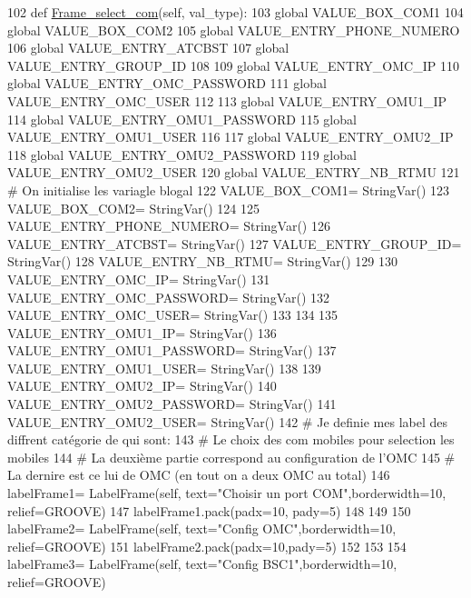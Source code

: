 \begin{DoxyCode}
102 \textcolor{keyword}{def }\hyperlink{namespaceScript_1_1interfaceFrame_a3538cb8357b74776a380240ed3221bc0}{Frame\_select\_com}(self, val\_type):
103     \textcolor{keyword}{global} VALUE\_BOX\_COM1 
104     \textcolor{keyword}{global} VALUE\_BOX\_COM2
105     \textcolor{keyword}{global} VALUE\_ENTRY\_PHONE\_NUMERO
106     \textcolor{keyword}{global} VALUE\_ENTRY\_ATCBST
107     \textcolor{keyword}{global} VALUE\_ENTRY\_GROUP\_ID
108 
109     \textcolor{keyword}{global} VALUE\_ENTRY\_OMC\_IP
110     \textcolor{keyword}{global} VALUE\_ENTRY\_OMC\_PASSWORD
111     \textcolor{keyword}{global} VALUE\_ENTRY\_OMC\_USER
112 
113     \textcolor{keyword}{global} VALUE\_ENTRY\_OMU1\_IP
114     \textcolor{keyword}{global} VALUE\_ENTRY\_OMU1\_PASSWORD
115     \textcolor{keyword}{global} VALUE\_ENTRY\_OMU1\_USER
116 
117     \textcolor{keyword}{global} VALUE\_ENTRY\_OMU2\_IP
118     \textcolor{keyword}{global} VALUE\_ENTRY\_OMU2\_PASSWORD
119     \textcolor{keyword}{global} VALUE\_ENTRY\_OMU2\_USER
120     \textcolor{keyword}{global} VALUE\_ENTRY\_NB\_RTMU
121     \textcolor{comment}{# On initialise les variagle blogal
}
122     VALUE\_BOX\_COM1= StringVar()
123     VALUE\_BOX\_COM2= StringVar()
124 
125     VALUE\_ENTRY\_PHONE\_NUMERO= StringVar()
126     VALUE\_ENTRY\_ATCBST= StringVar()
127     VALUE\_ENTRY\_GROUP\_ID= StringVar()
128     VALUE\_ENTRY\_NB\_RTMU= StringVar()
129 
130     VALUE\_ENTRY\_OMC\_IP= StringVar()
131     VALUE\_ENTRY\_OMC\_PASSWORD= StringVar()
132     VALUE\_ENTRY\_OMC\_USER= StringVar()
133 
134 
135     VALUE\_ENTRY\_OMU1\_IP= StringVar()
136     VALUE\_ENTRY\_OMU1\_PASSWORD= StringVar()
137     VALUE\_ENTRY\_OMU1\_USER= StringVar()
138 
139     VALUE\_ENTRY\_OMU2\_IP= StringVar()
140     VALUE\_ENTRY\_OMU2\_PASSWORD= StringVar()
141     VALUE\_ENTRY\_OMU2\_USER= StringVar()
142     \textcolor{comment}{# Je definie mes label des diffrent catégorie de qui sont:
}
143     \textcolor{comment}{# Le choix des com mobiles pour selection les mobiles
}
144     \textcolor{comment}{# La deuxième partie correspond au configuration de l'OMC
}
145     \textcolor{comment}{# La dernire est ce lui de OMC (en tout on a deux OMC au total)
}
146     labelFrame1= LabelFrame(self, text=\textcolor{stringliteral}{"Choisir un port COM"},borderwidth=10, relief=GROOVE)
147     labelFrame1.pack(padx=10, pady=5)
148 
149 
150     labelFrame2= LabelFrame(self, text=\textcolor{stringliteral}{"Config OMC"},borderwidth=10, relief=GROOVE)
151     labelFrame2.pack(padx=10,pady=5)
152 
153 
154     labelFrame3= LabelFrame(self, text=\textcolor{stringliteral}{"Config BSC1"},borderwidth=10, relief=GROOVE)

\end{DoxyCode}
